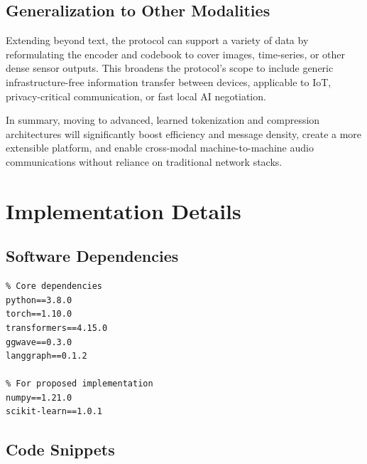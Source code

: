 \documentclass[12pt,openany]{article}
\theoremstyle{definition}
\theoremstyle{definition}
\theoremstyle{definition}
\begin{document}
\subsection*{Generalization to Other Modalities}

Extending beyond text, the protocol can support a variety of data by reformulating the encoder and codebook to cover images, time-series, or other dense sensor outputs. This broadens the protocol’s scope to include generic infrastructure-free information transfer between devices, applicable to IoT, privacy-critical communication, or fast local AI negotiation.

In summary, moving to advanced, learned tokenization and compression architectures will significantly boost efficiency and message density, create a more extensible platform, and enable cross-modal machine-to-machine audio communications without reliance on traditional network stacks.

\section*{Implementation Details}
\subsection*{Software Dependencies}
\begin{verbatim}
% Core dependencies
python==3.8.0
torch==1.10.0
transformers==4.15.0
ggwave==0.3.0
langgraph==0.1.2

% For proposed implementation
numpy==1.21.0
scikit-learn==1.0.1
\end{verbatim}

\subsection*{Code Snippets}
\end{document}
